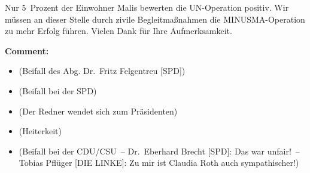 \documentclass{article}
\begin{document}
Nur 5 Prozent der Einwohner Malis bewerten die UN-Operation positiv. Wir müssen an dieser Stelle durch zivile Begleitmaßnahmen die MINUSMA-Operation zu mehr Erfolg führen. Vielen Dank für Ihre Aufmerksamkeit.   

\noindent\textbf{Comment:}
\begin{itemize}
    \setlength\itemsep{-3pt}
    \item (Beifall des Abg. Dr. Fritz Felgentreu [SPD])
    \setlength\itemsep{-3pt}
    \item (Beifall bei der SPD)
    \setlength\itemsep{-3pt}
    \item (Der Redner wendet sich zum Präsidenten)
    \setlength\itemsep{-3pt}
    \item (Heiterkeit)
    \setlength\itemsep{-3pt}
    \item (Beifall bei der CDU/CSU – Dr. Eberhard Brecht [SPD]: Das war unfair! – Tobias Pflüger [DIE LINKE]: Zu mir ist Claudia Roth auch sympathischer!)
\end{itemize}
\end{document}
